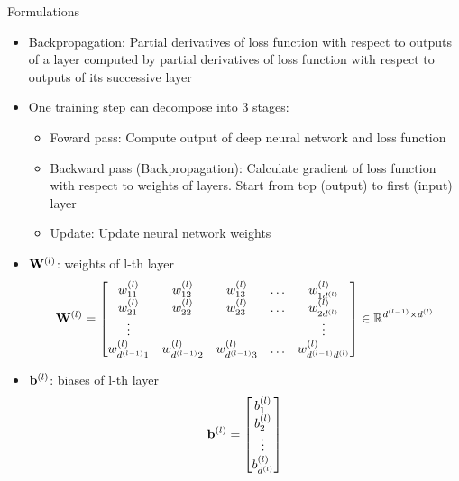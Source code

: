\documentclass[10pt]{beamer}
\theoremstyle{remark}
\theoremstyle{definition}
\begin{document}
\begin{frame}[allowframebreaks]{Formulations}
	\begin{itemize}
		\item Backpropagation: Partial derivatives of loss function with respect to outputs of a layer computed by partial derivatives of loss function with respect to outputs of its successive layer
  		\item One training step can decompose into 3 stages:
		\begin{itemize}
			\item Foward pass: Compute output of deep neural network and loss function
   			\item Backward pass (Backpropagation): Calculate gradient of loss function with respect to weights of layers. Start from top (output) to first (input) layer
      		\item Update: Update neural network weights
		\end{itemize}
	\end{itemize}
	\framebreak
	\begin{itemize}
		\item $\bold{W}^{(l)}$: weights of l-th layer
    	\begin{equation*}
			\bold{W}^{(l)}=\begin{bmatrix} w_{11}^{(l)} & w_{12}^{(l)} & w_{13}^{(l)} & \dots & w_{1d^{(l)}}^{(l)} \\ w_{21}^{(l)} & w_{22}^{(l)} & w_{23}^{(l)} & \dots & w_{2d^{(l)}}^{(l)} \\ \vdots & \thickspace & \thickspace & \thickspace & \vdots \\ w_{d^{(l-1)}1}^{(l)} & w_{d^{(l-1)}2}^{(l)} & w_{d^{(l-1)}3}^{(l)} & \dots & w_{d^{(l-1)}d^{(l)}}^{(l)}\end{bmatrix} \in \mathbb{R}^{d^{(l-1)} \times d^{(l)}}
		\end{equation*}
		\item $\bold{b}^{(l)}$: biases of l-th layer
		\begin{equation*}
			\bold{b}^{(l)}=\begin{bmatrix} b_1^{(l)} \\  b_2^{(l)} \\ \vdots \\ b_{d^{(l)}}^{(l)} \end{bmatrix}
		\end{equation*}
		\begin{figure}
			\centering
\end{figure}
\end{itemize}
\end{frame}
\end{document}

